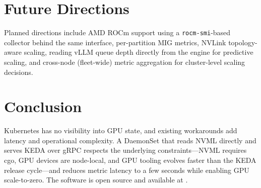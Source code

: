 \documentclass[11pt]{article}
\begin{document}
\section{Future Directions}

Planned directions include AMD ROCm support using a \texttt{rocm-smi}-based
collector behind the same interface, per-partition MIG metrics, NVLink
topology-aware scaling, reading vLLM queue depth directly from the engine for
predictive scaling, and cross-node (fleet-wide) metric aggregation for
cluster-level scaling decisions.

\section{Conclusion}

Kubernetes has no visibility into GPU state, and existing workarounds add latency
and operational complexity. A DaemonSet that reads NVML directly and serves KEDA
over gRPC respects the underlying constraints---NVML requires cgo, GPU devices
are node-local, and GPU tooling evolves faster than the KEDA release cycle---and
reduces metric latency to a few seconds while enabling GPU scale-to-zero. The
software is open source and available at \cite{kgs}.
\end{document}
